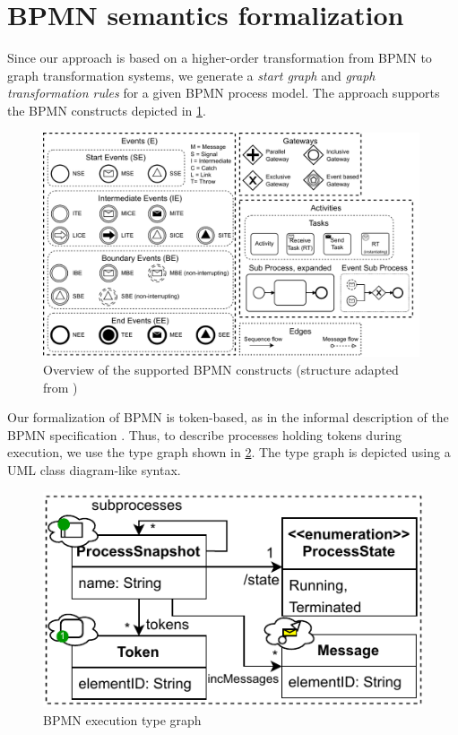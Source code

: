\documentclass[submission, copyright, creativecommons]{eptcs}
\begin{document}
\section{BPMN semantics formalization} \label{sec:formalization}

Since our approach is based on a higher-order transformation from BPMN to graph transformation systems, we generate a \emph{start graph} and \emph{graph transformation rules} for a given BPMN process model.
The approach supports the BPMN constructs depicted in \cref{fig:bpmnConstructsOverview}.

\begin{figure}[h]
    \centering
    \includegraphics[width=0.99\textwidth]{images/bpmn_semantics-feature-overview.pdf}
    \caption{Overview of the supported BPMN constructs (structure adapted from \cite{houhouFirstOrderLogicVerification2022})}
    \label{fig:bpmnConstructsOverview}
\end{figure}

Our formalization of BPMN is token-based, as in the informal description of the BPMN specification \cite{objectmanagementgroupBusinessProcessModel2013}.
Thus, to describe processes holding tokens during execution, we use the type graph shown in \cref{fig:typeGraph}.
The type graph is depicted using a UML class diagram-like syntax.

\begin{figure}
  \centering
  \includegraphics[width=0.5\linewidth]{images/bpmn_semantics-typegraph.pdf}
  \caption{BPMN execution type graph}
  \label{fig:typeGraph}
\end{figure}
\end{document}
